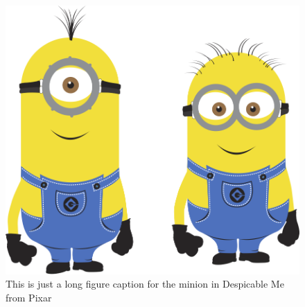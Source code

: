 \begin{figure}[htbp!] 
\centering    
\includegraphics[width=1.0\textwidth]{minion}
\caption[Minion]{This is just a long figure caption for the minion in Despicable Me from Pixar}
\label{fig:minion}
\end{figure}
